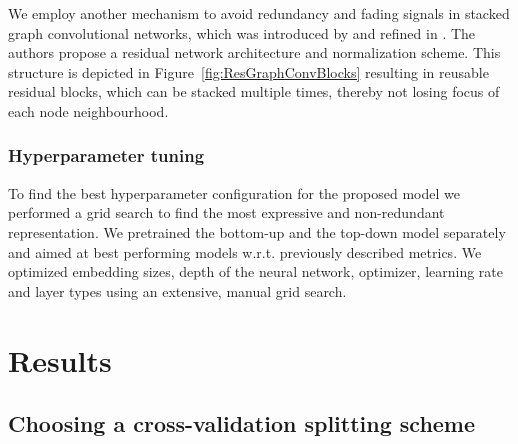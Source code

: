\documentclass{bioinfo}
\begin{document}
We employ another mechanism to avoid redundancy and fading signals in
stacked graph convolutional networks, which was introduced by
\citet{DeepGCN2019} and refined in \citet{DeeperGCN2020}. The authors
propose a residual network architecture and normalization scheme. This
structure is depicted in Figure~\ref{fig:ResGraphConvBlocks} resulting
in reusable residual blocks, which can be stacked multiple times,
thereby not losing focus of each node neighbourhood.



\subsubsection{Hyperparameter tuning}
To find the best hyperparameter configuration for the proposed model
we performed a grid search to find the most expressive and
non-redundant representation. We pretrained the bottom-up and the
top-down model separately and aimed at best performing models
w.r.t. previously described metrics. We optimized embedding sizes,
depth of the neural network, optimizer, learning rate and layer types
using an extensive, manual grid search. 


\section{Results}

\subsection{Choosing a cross-validation splitting scheme}

\end{document}
